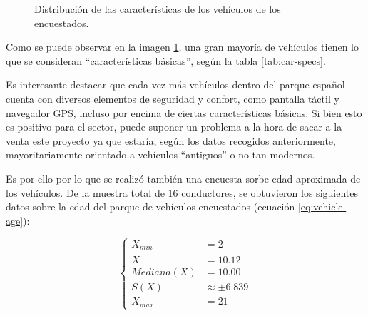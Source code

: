 \begin{figure}[H]

  \caption{Distribución de las características de los vehículos de los encuestados.}
  \label{fig:vehicle-specs}
\end{figure}

Como se puede observar en la imagen \ref{fig:vehicle-specs}, una gran mayoría de vehículos
tienen lo que se consideran ``características básicas'', según la tabla \ref{tab:car-specs}.

Es interesante destacar que cada vez más vehículos dentro del parque español cuenta con
diversos elementos de seguridad y confort, como pantalla táctil y navegador \ac{GPS},
incluso por encima de ciertas características básicas. Si bien esto es positivo para
el sector, puede suponer un problema a la hora de sacar a la venta este proyecto ya
que estaría, según los datos recogidos anteriormente, mayoritariamente orientado
a vehículos ``antiguos'' o no tan modernos.

Es por ello por lo que se realizó también una encuesta sorbe edad aproximada de
los vehículos. De la muestra total de 16 conductores, se obtuvieron los siguientes
datos sobre la edad del parque de vehículos encuestados (ecuación \ref{eq:vehicle-age}):

\begin{equation}\label{eq:vehicle-age}
  \left\{
  \begin{aligned}
    X_{min}               & = 2               \\
    \bar{X}               & = 10.12           \\
    Mediana\left(X\right) & = 10.00           \\
    S\left(X\right)       & \approx \pm 6.839 \\
    X_{max}               & = 21
  \end{aligned}
  \right.
\end{equation}

